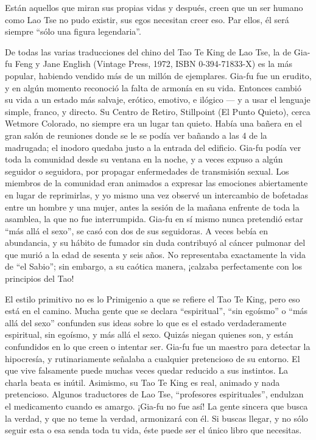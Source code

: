\documentclass[hidelinks]{memoir}
\begin{document}
	Están aquellos que miran sus propias vidas y después, creen que un ser
	humano como Lao Tse no pudo existir, sus egos necesitan creer eso. Par
	ellos, él será siempre ``sólo una figura legendaria''.
	
	De todas las varias traducciones del chino del Tao Te King de Lao Tse,
	la de Gia-fu Feng y Jane English (Vintage Press, 1972, ISBN
	0-394-71833-X) es la más popular, habiendo vendido más de un millón de
	ejemplares. Gia-fu fue un erudito, y en algún momento reconoció la falta
	de armonía en su vida. Entonces cambió su vida a un estado más salvaje,
	erótico, emotivo, e ilógico --- y a usar el lenguaje simple, franco, y
	directo. Su Centro de Retiro, Stillpoint (El Punto Quieto), cerca
	Wetmore Colorado, no siempre era un lugar tan quieto. Había una bañera
	en el gran salón de reuniones donde se le se podía ver bañando a las 4
	de la madrugada; el inodoro quedaba justo a la entrada del edificio.
	Gia-fu podía ver toda la comunidad desde su ventana en la noche, y a
	veces expuso a algún seguidor o seguidora, por propagar enfermedades de
	transmisión sexual. Los miembros de la comunidad eran animados a
	expresar las emociones abiertamente en lugar de reprimirlas, y yo mismo
	una vez observé un intercambio de bofetadas entre un hombre y una mujer,
	antes la sesión de la mañana enfrente de toda la asamblea, la que no fue
	interrumpida. Gia-fu en sí mismo nunca pretendió estar ``más allá el
	sexo'', se casó con dos de sus seguidoras. A veces bebía en abundancia,
	y su hábito de fumador sin duda contribuyó al cáncer pulmonar del que
	murió a la edad de sesenta y seis años. No representaba exactamente la
	vida de ``el Sabio''; sin embargo, a su caótica manera, ¡calzaba
	perfectamente con los principios del Tao!
	
	El estilo primitivo no es lo Primigenio a que se refiere el Tao Te King,
	pero eso está en el camino. Mucha gente que se declara ``espiritual'',
	``sin egoísmo'' o ``más allá del sexo'' confunden sus ideas sobre lo que
	es el estado verdaderamente espiritual, sin egoísmo, y más allá el sexo.
	Quizás niegan quienes son, y están confundidos en lo que creen o
	intentar ser. Gia-fu fue un maestro para detectar la hipocresía, y
	rutinariamente señalaba a cualquier pretencioso de su entorno. El que
	vive falsamente puede muchas veces quedar reducido a sus instintos. La
	charla beata es inútil. Asimismo, su Tao Te King es real, animado y nada
	pretencioso. Algunos traductores de Lao Tse, ``profesores
	espirituales'', endulzan el medicamento cuando es amargo. ¡Gia-fu no fue
	así! La gente sincera que busca la verdad, y que no teme la verdad,
	armonizará con él. Si buscas llegar, y no sólo seguir esta o esa senda
	toda tu vida, éste puede ser el único libro que necesitas.
	
\end{document}
